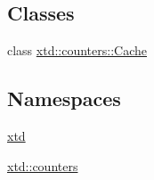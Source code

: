\subsection*{Classes}
\begin{DoxyCompactItemize}
\item 
class \hyperlink{classxtd_1_1counters_1_1Cache}{xtd\-::counters\-::\-Cache}
\end{DoxyCompactItemize}
\subsection*{Namespaces}
\begin{DoxyCompactItemize}
\item 
\hyperlink{namespacextd}{xtd}
\item 
\hyperlink{namespacextd_1_1counters}{xtd\-::counters}
\end{DoxyCompactItemize}
